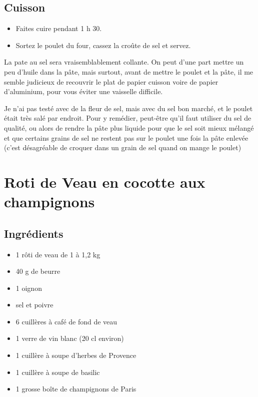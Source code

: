 \subsection*{Cuisson}
\begin{itemize}
\item Faites cuire pendant 1 h 30.
\item Sortez le poulet du four, cassez la croûte de sel et servez.
\end{itemize}


\begin{remarque}
La pate au sel sera vraisemblablement collante. On peut d'une part mettre un peu d'huile dans la pâte, mais surtout, avant de mettre le poulet et la pâte, il me semble judicieux de recouvrir le plat de papier cuisson voire de papier d'aluminium, pour vous éviter une vaisselle difficile.

Je n'ai pas testé avec de la fleur de sel, mais avec du sel bon marché, et le poulet était très salé par endroit. Pour y remédier, peut-être qu'il faut utiliser du sel de qualité, ou alors de rendre la pâte plus liquide pour que le sel soit mieux mélangé et que certains grains de sel ne restent pas sur le poulet une fois la pâte enlevée (c'est désagréable de croquer dans un grain de sel quand on mange le poulet)
\end{remarque}

\newpage
\section{Roti de Veau en cocotte aux champignons}
\subsection*{Ingrédients}
\begin{itemize}
\item 1 rôti de veau de 1 à 1,2 kg
\item 40 g de beurre
\item 1 oignon
\item sel et poivre
\item 6 cuillères à café de fond de veau
\item 1 verre de vin blanc (20 cl environ)
\item 1 cuillère à soupe d'herbes de Provence
\item 1 cuillère à soupe de basilic
\item 1 grosse boîte de champignons de Paris
\end{itemize}

